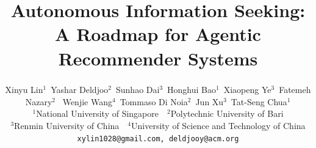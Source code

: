 \documentclass[11pt, a4paper, onecolumn, copyright]{AweAI}
\title{Autonomous Information Seeking: A Roadmap for Agentic Recommender Systems}
\author{%
  {Xinyu Lin$^1$~Yashar Deldjoo$^2$\textsuperscript{\Letter}~Sunhao Dai$^3$~Honghui Bao$^1$~Xiaopeng Ye$^3$~Fatemeh Nazary$^2$~
  Wenjie Wang$^4$~Tommaso Di Noia$^2$~Jun Xu$^3$~Tat-Seng Chua$^1$}\\
  $^1$National University of Singapore~~$^2$Polytechnic University of Bari\\
  $^3$Renmin University of China~~$^4$University of Science and Technology of China\\
  \texttt{xylin1028@gmail.com, deldjooy@acm.org}
}
\theoremstyle{definition}
\theoremstyle{remark}
\begin{document}
\begingroup
\makeatletter
\renewcommand{\thefootnote}{}
\renewcommand{\@makefnmark}{}
\maketitle
\makeatother
\endgroup











\end{document}
